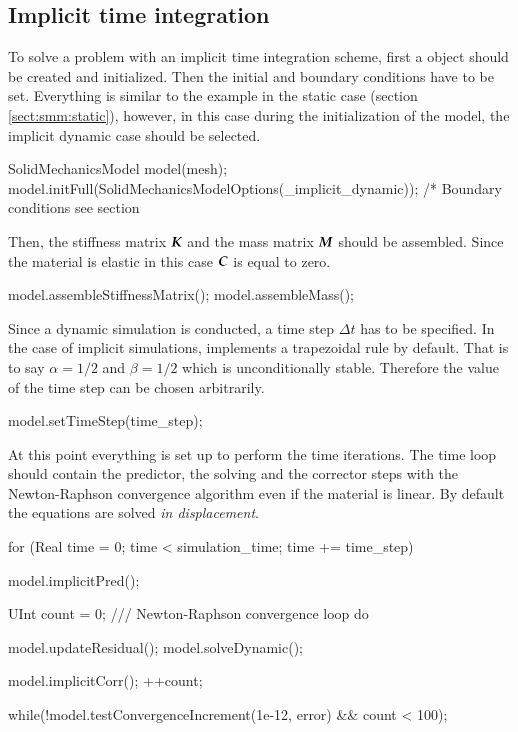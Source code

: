 

\subsection{Implicit time integration}
To  solve  a  problem  with   an  implicit  time  integration  scheme,  first  a
 object  should be created and  initialized.  Then the
initial and  boundary conditions have to  be set.  Everything is  similar to the
example  in the static  case (section  \ref{sect:smm:static}), however,  in this
case during the initialization of the model, the implicit dynamic case should be
selected.

\begin{cpp}
  SolidMechanicsModel model(mesh);
  model.initFull(SolidMechanicsModelOptions(_implicit_dynamic));
  /* Boundary conditions see section %
\end{cpp}

Then, the  stiffness matrix  $\boldsymbol{K}$ and the  mass matrix $\boldsymbol{M}$  should be
assembled.  Since  the material is  elastic in this  case $\boldsymbol{C}$ is  equal to
zero.
\begin{cpp}
  model.assembleStiffnessMatrix();
  model.assembleMass();
\end{cpp}

Since  a dynamic  simulation is  conducted, a  time step  $\Delta t$  has  to be
specified. In the case of  implicit simulations, \akantu implements a trapezoidal
rule by  default.  That  is to say  $\alpha =  1/2$ and $\beta  = 1/2$  which is
unconditionally  stable. Therefore  the value  of the  time step  can  be chosen
arbitrarily.  
\begin{cpp}
  model.setTimeStep(time_step);
\end{cpp}

At this point everything is set up to perform the time iterations. The time loop
should  contain the  predictor, the  solving and  the corrector  steps  with the
Newton-Raphson convergence algorithm even if the material is linear.  By default
the        equations       are       solved        \emph{in       displacement}.
\begin{cpp}
  for (Real time = 0; time < simulation_time; time += time_step) {
    model.implicitPred();

    UInt count = 0;
    /// Newton-Raphson convergence loop
    do {
      model.updateResidual();
      model.solveDynamic();

      model.implicitCorr();
      ++count;
    } while(!model.testConvergenceIncrement(1e-12, error) && count < 100);
  }
\end{cpp}

